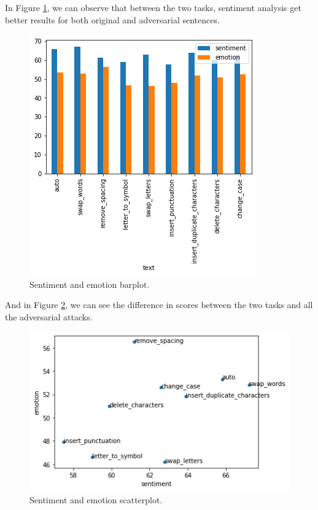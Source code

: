 \documentclass[11pt,a4paper]{article}
\begin{document}
In Figure \ref{fig:barplot}, we can observe that between the two tasks, sentiment analysis get better results for both original and adversarial sentences.

\begin{figure}[ht]
    \centering
    \includegraphics[width=\linewidth]{barplot_sentiment_emotion.png}
    \caption{Sentiment and emotion barplot.}
    \label{fig:barplot}
\end{figure}

And in Figure \ref{fig:scatterplot}, we can see the difference in scores between the two tasks and all the adversarial attacks. 

\begin{figure}[ht]
    \centering
    \includegraphics[width=\linewidth]{scatterplot_sentiment_emotion.png}
    \caption{Sentiment and emotion scatterplot.}
    \label{fig:scatterplot}
\end{figure}
\end{document}
